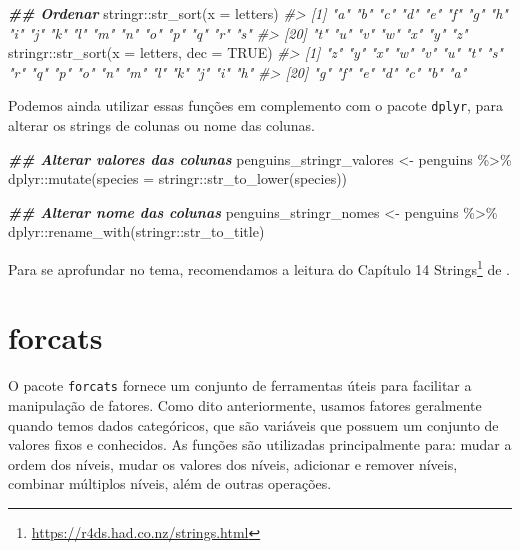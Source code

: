 \documentclass[
]{book}
\newenvironment{Shaded}{\begin{snugshade}}{\end{snugshade}}
\newcommand{\AttributeTok}[1]{\textcolor[rgb]{0.61,0.61,0.61}{#1}}
\newcommand{\CommentTok}[1]{\textcolor[rgb]{0.37,0.37,0.37}{\textit{#1}}}
\newcommand{\ConstantTok}[1]{\textcolor[rgb]{0,0,0}{#1}}
\newcommand{\DocumentationTok}[1]{\textcolor[rgb]{0.37,0.37,0.37}{\textbf{\textit{#1}}}}
\newcommand{\FunctionTok}[1]{\textcolor[rgb]{0,0,0}{#1}}
\newcommand{\NormalTok}[1]{#1}
\newcommand{\OtherTok}[1]{\textcolor[rgb]{0.37,0.37,0.37}{#1}}
\newcommand{\SpecialCharTok}[1]{\textcolor[rgb]{0,0,0}{#1}}
\renewcommand{\href}[2]{#2\footnote{\url{#1}}}
\begin{document}
\begin{Shaded}
\begin{Highlighting}[]
\DocumentationTok{\#\# Ordenar}
\NormalTok{stringr}\SpecialCharTok{::}\FunctionTok{str\_sort}\NormalTok{(}\AttributeTok{x =}\NormalTok{ letters)}
\CommentTok{\#\textgreater{}  [1] "a" "b" "c" "d" "e" "f" "g" "h" "i" "j" "k" "l" "m" "n" "o" "p" "q" "r" "s"}
\CommentTok{\#\textgreater{} [20] "t" "u" "v" "w" "x" "y" "z"}
\NormalTok{stringr}\SpecialCharTok{::}\FunctionTok{str\_sort}\NormalTok{(}\AttributeTok{x =}\NormalTok{ letters, }\AttributeTok{dec =} \ConstantTok{TRUE}\NormalTok{)}
\CommentTok{\#\textgreater{}  [1] "z" "y" "x" "w" "v" "u" "t" "s" "r" "q" "p" "o" "n" "m" "l" "k" "j" "i" "h"}
\CommentTok{\#\textgreater{} [20] "g" "f" "e" "d" "c" "b" "a"}
\end{Highlighting}
\end{Shaded}

Podemos ainda utilizar essas funções em complemento com o pacote \texttt{dplyr}, para alterar os strings de colunas ou nome das colunas.

\begin{Shaded}
\begin{Highlighting}[]
\DocumentationTok{\#\# Alterar valores das colunas}
\NormalTok{penguins\_stringr\_valores }\OtherTok{\textless{}{-}}\NormalTok{ penguins }\SpecialCharTok{\%\textgreater{}\%} 
\NormalTok{  dplyr}\SpecialCharTok{::}\FunctionTok{mutate}\NormalTok{(}\AttributeTok{species =}\NormalTok{ stringr}\SpecialCharTok{::}\FunctionTok{str\_to\_lower}\NormalTok{(species))}

\DocumentationTok{\#\# Alterar nome das colunas}
\NormalTok{penguins\_stringr\_nomes }\OtherTok{\textless{}{-}}\NormalTok{ penguins }\SpecialCharTok{\%\textgreater{}\%} 
\NormalTok{  dplyr}\SpecialCharTok{::}\FunctionTok{rename\_with}\NormalTok{(stringr}\SpecialCharTok{::}\NormalTok{str\_to\_title)}
\end{Highlighting}
\end{Shaded}

Para se aprofundar no tema, recomendamos a leitura do Capítulo \href{https://r4ds.had.co.nz/strings.html}{14 Strings} de \citet{wickham2017}.

\hypertarget{forcats}{%
\section{forcats}\label{forcats}}

O pacote \texttt{forcats} fornece um conjunto de ferramentas úteis para facilitar a manipulação de fatores. Como dito anteriormente, usamos fatores geralmente quando temos dados categóricos, que são variáveis que possuem um conjunto de valores fixos e conhecidos. As funções são utilizadas principalmente para: mudar a ordem dos níveis, mudar os valores dos níveis, adicionar e remover níveis, combinar múltiplos níveis, além de outras operações.
\end{document}
